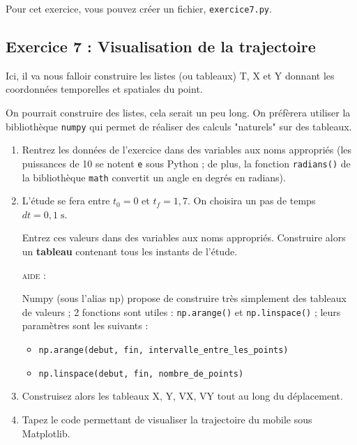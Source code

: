 \documentclass[11pt]{article}
\begin{document}
\medskip




Pour cet exercice, vous pouvez créer un fichier, \texttt{exercice7.py}.

\medskip


\subsection{Exercice 7 : Visualisation de la trajectoire}


Ici, il va nous falloir construire les listes (ou tableaux) T, X et Y donnant les coordonnées temporelles et spatiales du point.

\medskip
On pourrait construire des listes, cela serait un peu long. On préfèrera utiliser la bibliothèque \texttt{numpy} qui permet de réaliser des calculs "naturels" sur des tableaux.

\medskip



 
\begin{enumerate}
 \item Rentrez les données de l'exercice dans des variables aux noms appropriés (les puissances de 10 se notent \texttt{e} sous Python ; de plus, la fonction \texttt{radians()} de la bibliothèque \texttt{math} convertit un angle en degrés en radians).
 
 \item L'étude se fera entre $t_0 = 0$ et $t_f = 1,7$. On choisira un pas de temps $dt = 0,1\;\text{s}$.
 


 
 
 Entrez ces valeurs dans des variables aux noms appropriés. Construire alors un \textbf{tableau} contenant tous les instants de l'étude.
 
 \textsc{aide : }
 
 Numpy (sous l'alias np) propose de construire très simplement des tableaux de valeurs ; 2 fonctions sont utiles : \texttt{np.arange()} et \texttt{np.linspace()} ; leurs paramètres sont les suivants : 
 
 \begin{itemize}
  \item \texttt{np.arange(debut, fin, intervalle\_entre\_les\_points)}
  \item \texttt{np.linspace(debut, fin, nombre\_de\_points)}
 \end{itemize}
 
 
 
 \item Construisez alors les tableaux X, Y, VX, VY tout au long du déplacement.
 \item Tapez le code permettant de visualiser la trajectoire du mobile sous Matplotlib.

 
 

 \end{enumerate}
 
\end{document}
